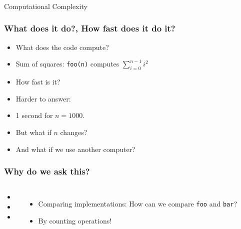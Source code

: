 \begin{frame}[fragile]\frametitle{}
\begin{center}
{\Large Computational Complexity}
\end{center}

\end{frame}

\begin{frame}
	\frametitle{What does it do?, How fast does it do it?}

		
			\begin{itemize}
			\item What does the code compute?
			\item Sum of squares: \texttt{foo(n)} computes $\sum\limits_{i=0}^{n-1} i^2$
			\item How fast is it?
			\item Harder to answer:
			\item 1 second for $n=1000$.
			\item But what if $n$ changes?
			\item And what if we use another computer?
	\end{itemize}
	
		
	
\end{frame}

\begin{frame}
	\frametitle{Why do we ask this?}

	\begin{columns}
			\begin{itemize}
			\item 
			\item
			\item 
	\end{itemize}
			
		
			\begin{itemize}
			\item Comparing implementations: 	How can we compare \texttt{foo} and \texttt{bar}?
			\item By counting operations!
		\end{itemize}
	\end{columns}
\end{frame}

